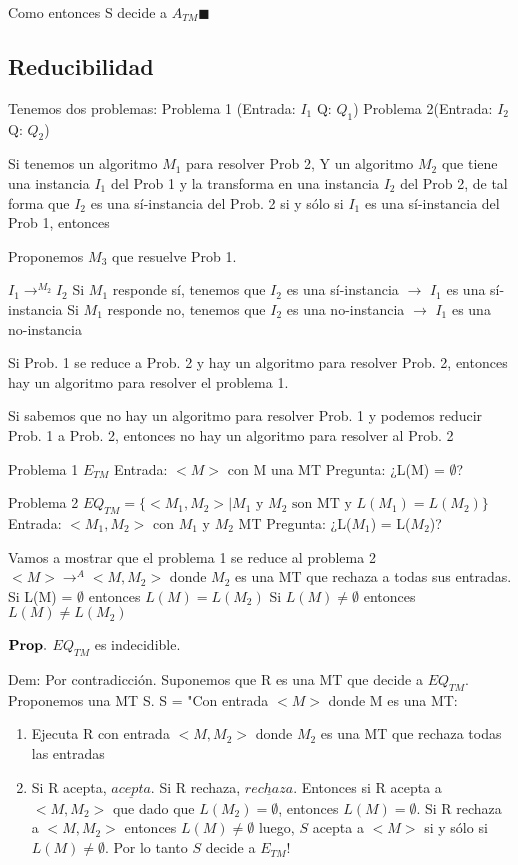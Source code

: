 \documentclass{homework}
\begin{document}
Como entonces S decide a $A_{TM} \blacksquare$

\subsection{Reducibilidad}

Tenemos dos problemas:
Problema 1 (Entrada: $I_1$ Q: $Q_1$) Problema 2(Entrada: $I_2$ Q: $Q_2$)

Si tenemos un algoritmo $M_1$ para resolver Prob 2, Y un algoritmo $M_2$ que tiene una instancia $I_1$ del Prob 1 y la transforma en una instancia $I_2$ del Prob 2, de tal forma que $I_2$ es una sí-instancia del Prob. 2 si y sólo si $I_1$ es una sí-instancia del Prob 1, entonces

Proponemos $M_3$ que resuelve Prob 1.

$I_1 \rightarrow^{M_2} I_2$ 
Si $M_1$ responde sí, tenemos que $I_2$ es una sí-instancia $\rightarrow$ $I_1$ es una sí-instancia
Si $M_1$ responde no, tenemos que $I_2$ es una no-instancia $\rightarrow$ $I_1$ es una no-instancia

Si Prob. 1 se reduce a Prob. 2 y hay un algoritmo para resolver Prob. 2, entonces hay un algoritmo para resolver el problema 1.

Si sabemos que no hay un algoritmo para resolver Prob. 1 y podemos reducir Prob. 1 a Prob. 2, entonces no hay un algoritmo para resolver al Prob. 2 

Problema 1 $E_{TM}$
Entrada: $<M>$ con M una MT
Pregunta: ¿L(M) = $\emptyset$?

Problema 2 $EQ_{TM} = \{<M_1,M_2>| M_1 \text{ y } M_2 \text{ son MT y } L(M_1) = L(M_2) \}$
Entrada: $<M_1, M_2>$ con $M_1$ y $M_2$ MT
Pregunta: ¿L($M_1$) = L($M_2$)?

Vamos a mostrar que el problema 1 se reduce al problema 2
$<M> \rightarrow^{A} <M, M_2>$ donde $M_2$ es una MT que rechaza a todas sus entradas. Si L(M) = $\emptyset$ entonces $L(M) = L(M_2)$
Si $L(M) \neq \emptyset$ entonces $L(M) \neq L(M_2)$

$\bf{Prop.}$ $EQ_{TM}$ es indecidible.

Dem: Por contradicción. Suponemos que R es una MT que decide a $EQ_{TM}$. Proponemos una MT S.
S = "Con entrada $<M>$ donde M es una MT:
\begin{enumerate}
	\item Ejecuta R con entrada $<M,M_2>$ donde $M_2$ es una MT que rechaza todas las entradas
	\item Si R acepta, $\underline{acepta}$. Si R rechaza, $\underline{rechaza}$.
	Entonces si R acepta a $<M,M_2>$ que dado que $L(M_2) = \emptyset$, entonces $L(M) = \emptyset$. Si R rechaza a $<M, M_2>$ entonces $L(M) \neq \emptyset$ luego, $S$ acepta a $<M>$ si y sólo si $L(M) \neq \emptyset$.
	Por lo tanto $S$ decide a $E_{TM}$!
\end{enumerate}
\end{document}
